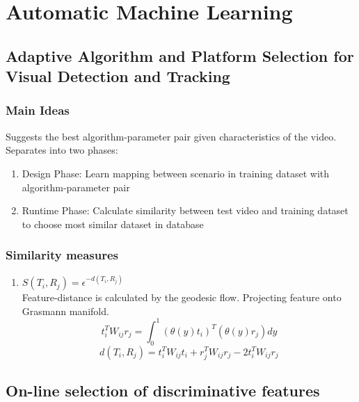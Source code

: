\chapter{Automatic Machine Learning}

\section{Adaptive Algorithm and Platform Selection for Visual Detection and Tracking}

\subsection{Main Ideas}

Suggests the best algorithm-parameter pair given characteristics of the video. Separates into two phases:

    \begin{enumerate}
        \item Design Phase: Learn mapping between scenario in training dataset with algorithm-parameter pair
        \item Runtime Phase: Calculate similarity between test video and training dataset to choose most similar dataset in database
    \end{enumerate}

\subsection{Similarity measures}
    
    \begin{enumerate}
        \item $S(T_i,R_j) = \epsilon^{-d(T_i,R_j)}$ \\
        Feature-distance is calculated by the geodesic flow. Projecting feature onto Grasmann manifold.
            \begin{equation}
                t_i^{T}W_{ij}r_{j} = \int_{0}^{1} (\theta(y)t_i)^T (\theta(y)r_j) dy
            \end{equation}
            \begin{equation}
                d(T_i,R_j) = t_i^{T}W_{ij}t_i + r_j^{T}W_{ij}r_j - 2t_i^{T}W_{ij}r_j
            \end{equation}
               
    \end{enumerate}

\section{On-line selection of discriminative features} \cite{collins2005online}

